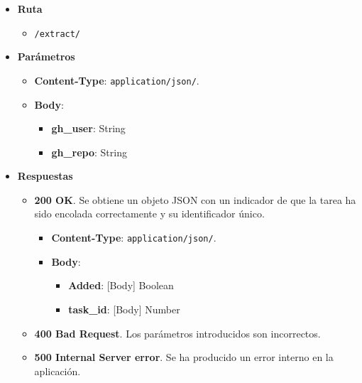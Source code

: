 \begin{itemize}
    \item[] \textbf{Ruta}
        \begin{itemize} \setlength\itemsep{0.2em}
            \item[] \texttt{/extract/}
        \end{itemize}
    \item[] \textbf{Parámetros}
        \begin{itemize} \setlength\itemsep{0.2em}
            \item[] \textbf{Content-Type}: \texttt{application/json/}.
            \item[] \textbf{Body}: 
                \begin{itemize} \setlength\itemsep{0.2em}
                    \item[] \textbf{gh\_user}: String
                    \item[] \textbf{gh\_repo}: String
                \end{itemize}
        \end{itemize}
    \item[] \textbf{Respuestas}
        \begin{itemize} \setlength\itemsep{0.2em}
            \item[] \textbf{200 OK}. Se obtiene un objeto JSON con un indicador de que la tarea ha sido encolada correctamente y su identificador único.
                \begin{itemize} \setlength\itemsep{0.2em}
                    \item[] \textbf{Content-Type}: \texttt{application/json/}.
                    \item[] \textbf{Body}: 
                        \begin{itemize} \setlength\itemsep{0.2em}
                            \item[] \textbf{Added}: [Body] Boolean
                            \item[] \textbf{task\_id}: [Body] Number
                        \end{itemize}
                \end{itemize}
            \item[] \textbf{400 Bad Request}. Los parámetros introducidos son incorrectos.
            \item[] \textbf{500 Internal Server error}. Se ha producido un error interno en la aplicación.
        \end{itemize}
\end{itemize}

